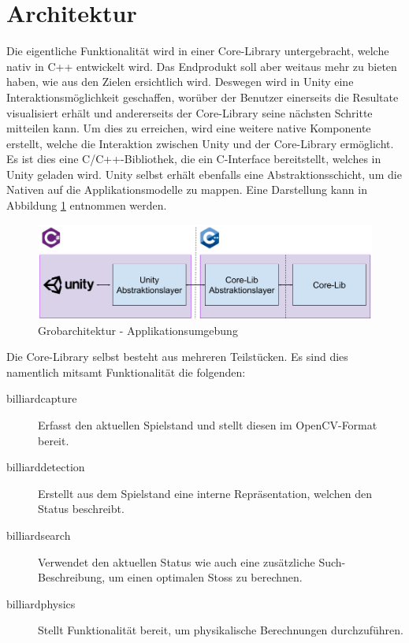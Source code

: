 \section{Architektur}
Die eigentliche Funktionalität wird in einer Core-Library untergebracht, welche nativ in C++ entwickelt wird. Das
Endprodukt soll aber weitaus mehr zu bieten haben, wie aus den Zielen ersichtlich wird. Deswegen wird in Unity eine
Interaktionsmöglichkeit geschaffen, worüber der Benutzer einerseits die Resultate visualisiert erhält und
andererseits der Core-Library seine nächsten Schritte mitteilen kann. Um dies zu erreichen, wird eine weitere native
Komponente erstellt, welche die Interaktion zwischen Unity und der Core-Library ermöglicht. Es ist dies eine C/C++-Bibliothek,
die ein C-Interface bereitstellt, welches in Unity geladen wird. Unity selbst erhält ebenfalls eine Abstraktionsschicht,
um die Nativen auf die Applikationsmodelle zu mappen. Eine Darstellung kann in Abbildung \ref{fig:top-level-architecture} entnommen
werden.

\begin{figure}[h!]
    \begin{center}
        \includegraphics[width=0.8\linewidth]{../common/03_billiard_ai/resources/00_top_level_architecture.png}
    \end{center}
    \caption{Grobarchitektur - Applikationsumgebung}
    \label{fig:top-level-architecture}
\end{figure}

Die Core-Library selbst besteht aus mehreren Teilstücken. Es sind dies namentlich mitsamt Funktionalität die
folgenden:
\begin{description}
    \item[billiard\textunderscore capture] Erfasst den aktuellen Spielstand und stellt diesen im OpenCV-Format bereit.
    \item[billiard\textunderscore detection] Erstellt aus dem Spielstand eine interne Repräsentation, welchen den Status beschreibt.
    \item[billiard\textunderscore search] Verwendet den aktuellen Status wie auch eine zusätzliche Such-Beschreibung, um einen optimalen
    Stoss zu berechnen.
    \item[billiard\textunderscore physics] Stellt Funktionalität bereit, um physikalische Berechnungen durchzuführen.
\end{description}




